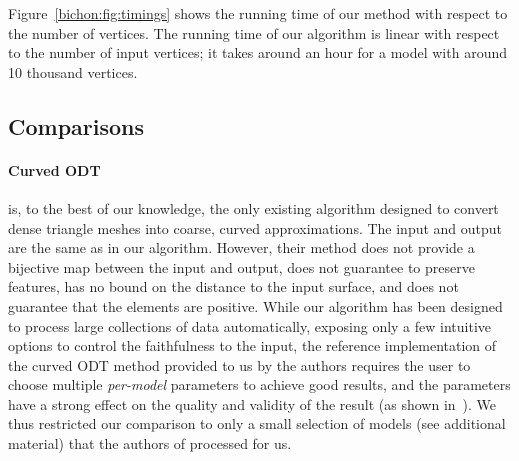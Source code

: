 Figure~\ref{bichon:fig:timings} shows the running time of our method with respect to the number of vertices. The running time of our algorithm is linear with respect to the number of input vertices; it takes around an hour for a model with around 10 thousand vertices.


\subsection{Comparisons}\label{sec:comparison}



\paragraph{Curved ODT}
\cite{feng2018curved} is, to the best of our knowledge, the only existing algorithm designed to convert dense triangle meshes into coarse, curved approximations. The input and output are the same as in our algorithm. However, their method does not provide a bijective map between the input and output, does not guarantee to preserve features, has no bound on the distance to the input surface, and does not guarantee that the elements are positive. While our algorithm has been designed to process large collections of data automatically, exposing only a few intuitive options to control the faithfulness to the input, the reference implementation of the curved ODT method provided to us by the authors requires the user to choose multiple \emph{per-model} parameters to achieve good results, and the parameters have a strong effect on the quality and validity of the result (as shown in~\cite[Figure 16]{feng2018curved}). We thus restricted our comparison to only a small selection of models (see additional material) that the authors of \cite{feng2018curved} processed for us.
%
